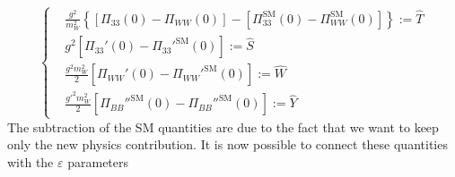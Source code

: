 \documentclass[../main.tex]{subfiles}
\begin{document}
\[
\left\{
\begin{aligned}
&\frac{g^2}{m_W^2}\left\{[\Pi_{33}(0)-\Pi_{WW}(0)]-[\Pi_{33}^{\text{SM}}(0)-\Pi_{WW}^{\text{SM}}(0)]\right\}:=\hat{T}\\
&g^2[\Pi_{33}'(0)-\Pi_{33}'^{\text{SM}}(0)]:=\hat{S}\\
&\frac{g^2m_W^2}{2}[\Pi_{WW}'(0)-\Pi_{WW}'^{\text{SM}}(0)]:=\hat{W}\\
&\frac{g'^2m_W^2}{2}[\Pi_{BB}''^{\text{SM}}(0)-\Pi_{BB}''^{\text{SM}}(0)]:=\hat{Y}
\end{aligned}
\right.
\]
The subtraction of the SM quantities are due to the fact that we want to keep only the new physics contribution. It is now possible to connect these quantities with the $\varepsilon$ parameters
\end{document}

